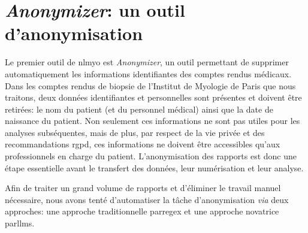 \section{\textit{Anonymizer}: un outil d'anonymisation}
Le premier outil de \gls{nlmyo} est \textit{Anonymizer}, un outil permettant de supprimer automatiquement les informations identifiantes des comptes rendus médicaux. Dans les comptes rendus de biopsie de l'Institut de Myologie de Paris que nous traitons, deux données identifiantes et personnelles sont présentes et doivent être retirées: le nom du patient (et du personnel médical) ainsi que la date de naissance du patient. Non seulement ces informations ne sont pas utiles pour les analyses subséquentes, mais de plus, par respect de la vie privée et des recommandations \gls{rgpd}, ces informations ne doivent être accessibles qu'aux professionnels en charge du patient. L'anonymisation des rapports est donc une étape essentielle avant le transfert des données, leur numérisation et leur analyse.

Afin de traiter un grand volume de rapports et d'éliminer le travail manuel nécessaire, nous avons tenté d'automatiser la tâche d'anonymisation \textit{via} deux approches: une approche traditionnelle par\gls{regex} et une approche novatrice par\gls{llms}.


